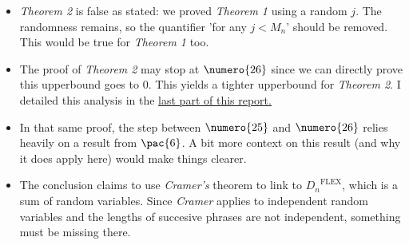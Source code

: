 \begin{itemize}
\item \emph{Theorem 2} is false as stated: we proved \emph{Theorem 1}
      using a random $j$. The randomness remains, so the quantifier
      'for any $j < M_n$' should be removed. This would be true for 
      \emph{Theorem 1} too.

\item The proof of \emph{Theorem 2} may stop at $\numero{26}$
      since we can directly prove this upperbound goes to $0$.
      This yields a tighter upperbound for \emph{Theorem 2}.
      I detailed this analysis in the 
      \hyperlink{upperbound}{last part of this report.}

\item In that same proof, the step between $\numero{25}$ and 
      $\numero{26}$ relies heavily on a result from $\pac{6}$.
      A bit more context on this result (and why it does apply here)
      would make things clearer.

\item The conclusion claims to use \emph{Cramer's} theorem to link
      to ${D_n}^{\text{FLEX}}$, which is a sum of random variables.
      Since \emph{Cramer} applies to independent random variables and the 
      lengths of succesive phrases are not independent, something must be missing 
      there.
      
\end{itemize}